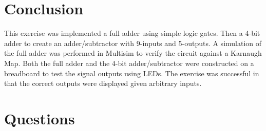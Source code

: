 \documentclass[CMPE]{KGCOEReport}
\begin{document}
\section*{Conclusion}

This exercise was implemented a full adder using simple logic gates. Then a 4-bit adder to create an adder/subtractor with 9-inputs and 5-outputs. A simulation of the full adder was performed in Multisim to verify the circuit against a Karnaugh Map. Both the full adder and the 4-bit adder/subtractor were constructed on a breadboard to test the signal outputs using LEDs. The exercise was successful in that the correct outputs were displayed given arbitrary inputs.

\section*{Questions}
\end{document}
